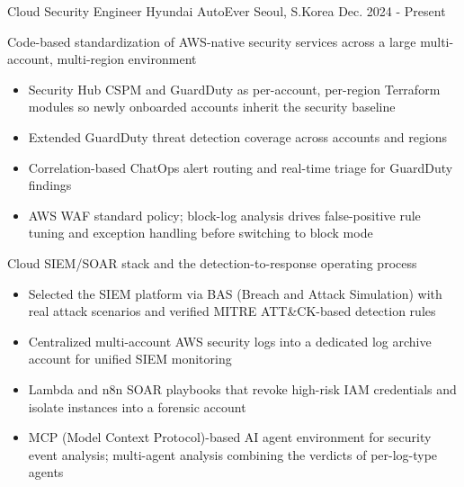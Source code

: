 
\begin{cventries}

\cventry
    {Cloud Security Engineer} %
    {Hyundai AutoEver} %
    {Seoul, S.Korea} %
    {Dec. 2024 - Present} %
    {
      \begin{cvitems}
        \item {Code-based standardization of AWS-native security services across a large multi-account, multi-region environment}
        \begin{itemize}
          \item {Security Hub CSPM and GuardDuty as per-account, per-region Terraform modules so newly onboarded accounts inherit the security baseline}
          \item {Extended GuardDuty threat detection coverage across accounts and regions}
          \item {Correlation-based ChatOps alert routing and real-time triage for GuardDuty findings}
          \item {AWS WAF standard policy; block-log analysis drives false-positive rule tuning and exception handling before switching to block mode}
        \end{itemize}
        \item {Cloud SIEM/SOAR stack and the detection-to-response operating process}
        \begin{itemize}
          \item {Selected the SIEM platform via BAS (Breach and Attack Simulation) with real attack scenarios and verified MITRE ATT\&CK-based detection rules}
          \item {Centralized multi-account AWS security logs into a dedicated log archive account for unified SIEM monitoring}
          \item {Lambda and n8n SOAR playbooks that revoke high-risk IAM credentials and isolate instances into a forensic account}
          \item {MCP (Model Context Protocol)-based AI agent environment for security event analysis; multi-agent analysis combining the verdicts of per-log-type agents}

\end{itemize}
\end{cvitems}}
\end{cventries}
